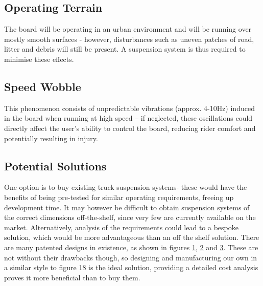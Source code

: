 \documentclass[journal,10pt]{IEEEtran}
\begin{document}
    \subsection{Operating Terrain}
        The board will be operating in an urban environment and will be running over mostly smooth surfaces - however, disturbances such as uneven patches of road, litter and debris will still be present. A suspension system is thus required to minimise these effects.
    \subsection{Speed Wobble}
        This phenomenon consists of unpredictable vibrations (approx. 4-10Hz) induced in the board when running at high speed – if neglected, these oscillations could directly affect the user’s ability to control the board, reducing rider comfort and potentially resulting in injury. 
    \subsection{Potential Solutions}
        One option is to buy existing truck suspension systems- these would have the benefits of being pre-tested for similar operating requirements, freeing up development time. It may however be difficult to obtain suspension systems of the correct dimensions off-the-shelf, since very few are currently available on the market. Alternatively, analysis of the requirements could lead to a bespoke solution, which would be more advantageous than an off the shelf solution.
        There are many patented designs in existence, as shown in figures \ref{fig: Spring Idea}, \ref{fig: Seperate Spring Idea} and \ref{fig: Hanger Idea}. These are not without their drawbacks though, so designing and manufacturing our own in a similar style to figure 18 is the ideal solution, providing a detailed cost analysis proves it more beneficial than to buy them.
        \begin{figure}[H]
            \centering
            \caption{}
            \label{fig: Spring Idea}
        \end{figure}
        \begin{figure}[H]
            \centering
            \caption{}
            \label{fig: Seperate Spring Idea}
        \end{figure}
        \begin{figure}[H]
            \centering
            \caption{}
            \label{fig: Hanger Idea}
        \end{figure}
\end{document}
